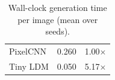 \begin{table}[H]
    \centering
    \caption{Wall-clock generation time per image (mean over seeds).}
    \label{tab:prior_timing}
    \begin{tabular}{lrr}
        \toprule
        PixelCNN & 0.260 & 1.00$\times$ \\
        Tiny LDM & 0.050 & 5.17$\times$ \\
        \bottomrule
    \end{tabular}
\end{table}
